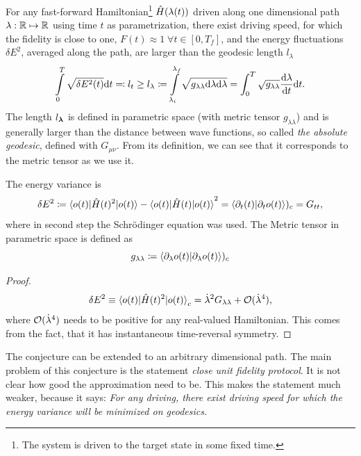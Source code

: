 \begin{thm}
    \label{thm:polkovnikov}
    For any fast-forward Hamiltonian\footnote{The system is driven to the target state in some fixed time.} $\hat{H}(\lambda(t))$ driven along one dimensional path $\lambda: \mathbb{R}\mapsto \mathbb{R}$ using time $t$ as parametrization, there exist driving speed, for which the fidelity is close to one, $F(t)\approx 1 \;\forall t\in[0,T_f]$, and the energy fluctuations $\delta E^2$, averaged along the path, are larger than the geodesic length $l_\lambda$
    \begin{equation}
        \int\limits_0^T\sqrt{\delta E^2(t)}\mathrm{d} t \eqqcolon l_t\geq l_\lambda \coloneqq \int\limits_{\lambda_i}^{\lambda_f} \sqrt{g_{\lambda\lambda}\mathrm{d} \lambda\mathrm{d} \lambda} =\int_0^T \sqrt{g_{\lambda\lambda}}\frac{\mathrm{d} \lambda}{\mathrm{d} t}\mathrm{d} t.
    \end{equation}
    The length $l_{\bm\lambda}$ is defined in parametric space (with metric tensor $g_{\lambda\lambda}$) and is generally larger than the distance between wave functions, so called \emph{the absolute geodesic}, defined with $G_{\mu\nu}$. From its definition, we can see that it corresponds to the metric tensor as we use it.
    
    
    
    The energy variance is 
    \begin{equation}
        \delta E^2\coloneqq \braket{o(t)|\hat{H}(t)^2|o(t)}-\braket{o(t)|\hat{H}(t)|o(t)}^2=\braket{\partial_t (t)|\partial_t o(t)})_c=G_{tt},
    \end{equation}    
    where in second step the Schr\"odinger equation was used. The Metric tensor in parametric space is defined as
    \begin{equation}
        g_{\lambda\lambda}\coloneqq \braket{\partial_\lambda o(t)|\partial_\lambda o(t)})_c
    \end{equation}
\end{thm}


\begin{proof}
    \begin{equation}
        \delta E^2\equiv \braket{o(t)|\hat{H}(t)^2|o(t)}_c=\dot\lambda^2 G_{\lambda\lambda}+\mathcal{O}(\dot\lambda^4),
    \end{equation}
    where $\mathcal{O}(\dot\lambda^4)$ needs to be positive for any real-valued Hamiltonian. This comes from the fact, that it has instantaneous time-reversal symmetry.
\end{proof}

The conjecture can be extended to an arbitrary dimensional path. The main problem of this conjecture is the statement \emph{close unit fidelity protocol}. It is not clear how good the approximation need to be. This makes the statement much weaker, because it says: \emph{For any driving, there exist driving speed for which the energy variance will be minimized on geodesics.}










